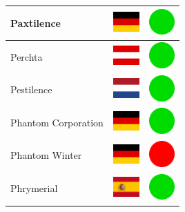 \documentclass[12pt, a4paper, twoside]{report}
\begin{document}
\begin{center}
\begin{longtable}{|p{5cm}|p{2cm}|p{2cm}|}
 Paxtilence                                                 & \includegraphics[width=1cm]{4x3/de} &   \includegraphics[width=1cm]{likes/y} \\ \hline
 Perchta                                                    & \includegraphics[width=1cm]{4x3/at} &   \includegraphics[width=1cm]{likes/y} \\ \hline
 Pestilence                                                 & \includegraphics[width=1cm]{4x3/nl} &   \includegraphics[width=1cm]{likes/y} \\ \hline
 Phantom Corporation                                        & \includegraphics[width=1cm]{4x3/de} &   \includegraphics[width=1cm]{likes/y} \\ \hline
 Phantom Winter                                             & \includegraphics[width=1cm]{4x3/de} &   \includegraphics[width=1cm]{likes/n} \\ \hline
 Phrymerial                                                 & \includegraphics[width=1cm]{4x3/es} &   \includegraphics[width=1cm]{likes/y} \\ \hline

\end{longtable}
\end{center}
\end{document}
